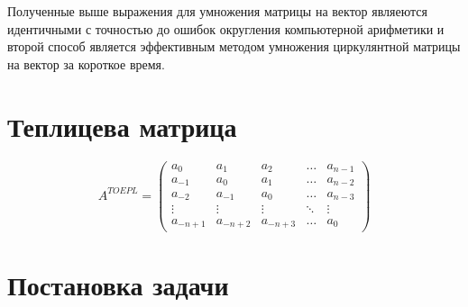 \documentclass[
]{article}
\begin{document}
Полученные выше выражения для умножения матрицы на вектор являеются
идентичными с точностью до ошибок округления компьютерной арифметики и
второй способ является эффективным методом умножения циркулянтной
матрицы на вектор за короткое время.

\hypertarget{ux442ux435ux43fux43bux438ux446ux435ux432ux430-ux43cux430ux442ux440ux438ux446ux430}{%
\section{\texorpdfstring{\textbf{Теплицева
матрица}}{Теплицева матрица}}\label{ux442ux435ux43fux43bux438ux446ux435ux432ux430-ux43cux430ux442ux440ux438ux446ux430}}

\[
A^{TOEPL} = 
\begin{pmatrix} 
a_0 & a_1 & a_2 & \dots & a_{n-1} \\
a_{-1} & a_0 & a_1 & \dots & a_{n-2} \\ 
a_{-2} & a_{-1} & a_0 & \dots & a_{n-3} \\
\vdots & \vdots & \vdots & \ddots & \vdots \\
a_{-n+1} & a_{-n+2} & a_{-n+3} & \dots & a_{0}
\end{pmatrix}
\]

\hypertarget{ux43fux43eux441ux442ux430ux43dux43eux432ux43aux430-ux437ux430ux434ux430ux447ux438}{%
\section{\texorpdfstring{\textbf{Постановка
задачи}}{Постановка задачи}}\label{ux43fux43eux441ux442ux430ux43dux43eux432ux43aux430-ux437ux430ux434ux430ux447ux438}}
\end{document}
